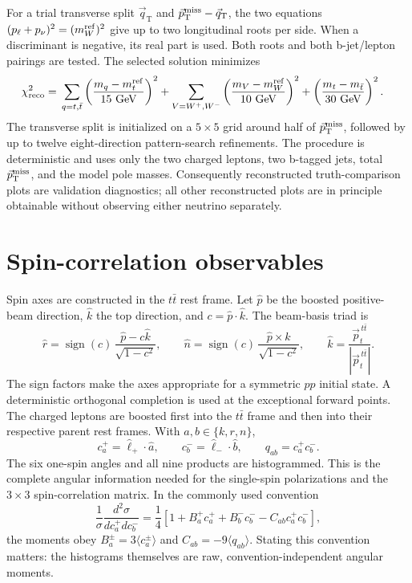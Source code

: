 \documentclass[10pt,a4paper]{article}
\newcommand{\ttbar}{t\bar t}
\newcommand{\Wp}{W^+}
\newcommand{\Wm}{W^-}
\begin{document}
For a trial transverse split
\(\vec q_{\mathrm T}\) and
\(\vec p_{\mathrm T}^{\rm miss}-\vec q_{\mathrm T}\), the two equations
\((p_{\ell}+p_\nu)^2=(m_W^{\rm ref})^2\) give up to two longitudinal roots per
side.  When a discriminant is negative, its real part is used.  Both roots and
both b-jet/lepton pairings are tested.  The selected solution minimizes
\begin{align}
 \chi^2_{\rm reco}={}&
 \sum_{q=t,\bar t}\left(\frac{m_q-m_t^{\rm ref}}{15\ \mathrm{GeV}}\right)^2
 +\sum_{V=\Wp,\Wm}\left(\frac{m_V-m_W^{\rm ref}}{10\ \mathrm{GeV}}\right)^2
 +\left(\frac{m_t-m_{\bar t}}{30\ \mathrm{GeV}}\right)^2.
\end{align}
The transverse split is initialized on a \(5\times5\) grid around half of
\(\vec p_{\mathrm T}^{\rm miss}\), followed by up to twelve eight-direction
pattern-search refinements.  The procedure is deterministic and uses only the
two charged leptons, two b-tagged jets, total \(\vec p_{\mathrm T}^{\rm miss}\),
and the model pole masses.  Consequently reconstructed truth-comparison plots
are validation diagnostics; all other reconstructed plots are in principle
obtainable without observing either neutrino separately.

\section{Spin-correlation observables}
\label{sec:spin}

Spin axes are constructed in the \(\ttbar\) rest frame.  Let \(\hat p\) be
the boosted positive-beam direction, \(\hat k\) the top direction, and
\(c=\hat p\cdot\hat k\).  The beam-basis triad is
\begin{equation}
 \hat r=\operatorname{sign}(c)\,
 \frac{\hat p-c\hat k}{\sqrt{1-c^2}},\qquad
 \hat n=\operatorname{sign}(c)\,
 \frac{\hat p\times\hat k}{\sqrt{1-c^2}},\qquad
 \hat k=\frac{\vec p_t^{\,\ttbar}}{|\vec p_t^{\,\ttbar}|}.
\end{equation}
The sign factors make the axes appropriate for a symmetric \(pp\) initial
state.  A deterministic orthogonal completion is used at the exceptional
forward points.  The charged leptons are boosted first into the \(\ttbar\)
frame and then into their respective parent rest frames.  With
\(a,b\in\{k,r,n\}\),
\begin{equation}
 c_a^+=\hat\ell_+\cdot\hat a,\qquad
 c_b^-=\hat\ell_-\cdot\hat b,
 \qquad q_{ab}=c_a^+c_b^-.
\end{equation}
The six one-spin angles and all nine products are histogrammed.  This is the
complete angular information needed for the single-spin polarizations and the
\(3\times3\) spin-correlation matrix.  In the commonly used convention
\begin{equation}
 \frac1\sigma\frac{d^2\sigma}{dc_a^+dc_b^-}
 =\frac14\left[1+B_a^+c_a^+ + B_b^-c_b^- -C_{ab}c_a^+c_b^-\right],
\end{equation}
the moments obey \(B_a^\pm=3\langle c_a^\pm\rangle\) and
\(C_{ab}=-9\langle q_{ab}\rangle\).  Stating this convention matters: the
histograms themselves are raw, convention-independent angular moments.
\end{document}
